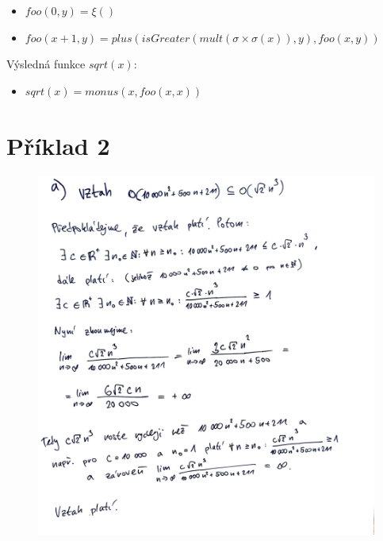 \documentclass[11pt, a4paper, titlepage]{article}
\begin{document}
\begin{itemize}
	\item $foo(0, y) = \xi()$
	\item $foo(x+1, y) = plus (isGreater (mult(\sigma \times \sigma(x)), y), foo(x, y))$
\end{itemize}

Výsledná funkce $sqrt(x)$:

\begin{itemize}
	\item $sqrt(x) = monus (x,  foo(x, x))$
\end{itemize}

\newpage


\section*{Příklad 2}

\begin{figure}[H]
	\begin{center}
		\includegraphics[page=1,scale=0.55]{images/tin-4-2-1.png}
	\end{center}
\end{figure}
\end{document}
